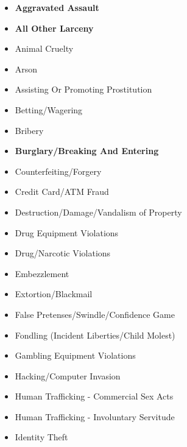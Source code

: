 \documentclass[
]{krantz}
\providecommand{\tightlist}{%
  \setlength{\itemsep}{0pt}\setlength{\parskip}{0pt}}
\begin{document}
\begin{itemize}
\tightlist
\item
  \textbf{Aggravated Assault}\\
\item
  \textbf{All Other Larceny}\\
\item
  Animal Cruelty\\
\item
  Arson\\
\item
  Assisting Or Promoting Prostitution\\
\item
  Betting/Wagering\\
\item
  Bribery\\
\item
  \textbf{Burglary/Breaking And Entering}\\
\item
  Counterfeiting/Forgery\\
\item
  Credit Card/ATM Fraud\\
\item
  Destruction/Damage/Vandalism of Property\\
\item
  Drug Equipment Violations\\
\item
  Drug/Narcotic Violations\\
\item
  Embezzlement\\
\item
  Extortion/Blackmail\\
\item
  False Pretenses/Swindle/Confidence Game\\
\item
  Fondling (Incident Liberties/Child Molest)\\
\item
  Gambling Equipment Violations\\
\item
  Hacking/Computer Invasion\\
\item
  Human Trafficking - Commercial Sex Acts\\
\item
  Human Trafficking - Involuntary Servitude\\
\item
  Identity Theft\\

\end{itemize}
\end{document}
